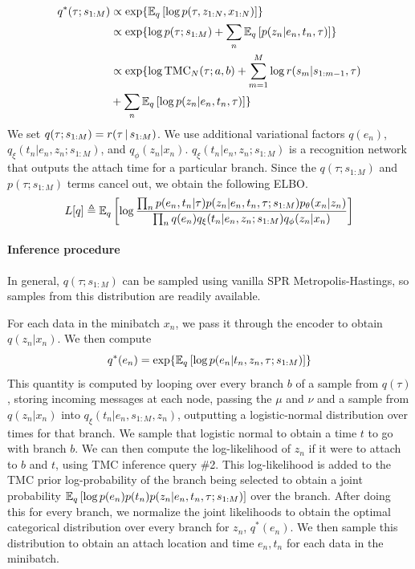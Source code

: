 \begin{equation}
\begin{split}
    q^*(\tau; s_{1:M}) 
    &\propto \exp{\E_q\left[\log p(\tau, z_{1:N}, x_{1:N})\right]} \\
    &\propto \exp{\log p(\tau ; s_{1:M}) + \sum_n \E_q\left[p(z_n | e_n, t_n, \tau)\right]} \\
    &\propto \exp{\log \mathrm{TMC}_N(\tau; a, b) + \sum_{m = 1}^M \log r(s_m | s_{1:m - 1}, \tau) \\&+ \sum_n \E_q\left[\log p(z_n | e_n, t_n, \tau)\right]} \\
\end{split}
\end{equation}
We  set $q(\tau; s_{1:M}) = r(\tau \,|\, s_{1:M})$.
We use additional variational factors
$q(e_n)$,
$q_{\xi}(t_n | e_n, z_n; s_{1:M})$,
and
$q_\phi(z_n | x_n)$.
$q_{\xi}(t_n | e_n, z_n; s_{1:M})$ is a
recognition network that outputs
the attach time for a particular branch.
Since the $q(\tau; s_{1:M})$ and $p(\tau; s_{1:M})$ terms
cancel out, we obtain the following ELBO.
\begin{equation}
    \begin{split}
    L[q] &\triangleq \mathbb{E}_q \left[\log \frac{\prod_n p(e_n, t_n | \tau) p(z_n | e_n, t_n, \tau; s_{1:M})p_\theta(x_n | z_n)}{\prod_n q(e_n)q_{\xi}(t_n | e_n, z_n; s_{1:M})q_\phi(z_n | x_n)}\right] \\
    \end{split}
\end{equation}

\paragraph{Inference procedure}
In general, $q(\tau; s_{1:M})$ can
be sampled using vanilla SPR Metropolis-Hastings,
so samples from this distribution are readily available. 

For each data in the minibatch $x_n$, we pass it
through the encoder to obtain $q(z_n | x_n)$.
We then compute
\begin{equation}
    q^*(e_n) = \exp{\E_q\left[\log p(e_n | t_n, z_n, \tau; s_{1:M})\right]}
\end{equation}
This quantity is computed by looping
over every branch $b$ of 
a sample from $q(\tau)$,
storing incoming messages at each node,
passing the $\mu$ and $\nu$
and a sample from $q(z_n | x_n)$
into $q_\xi(t_n | e_n, s_{1:M}, z_n)$,
outputting a logistic-normal distribution
over times for that branch. We sample that
logistic normal to obtain a time $t$
to go with branch $b$. We can then compute
the log-likelihood of $z_n$ if it were
to attach to $b$ and $t$, using TMC
inference query \#2.
This log-likelihood is added to the TMC prior log-probability
of the branch being selected to obtain
a joint probability $\mathbb{E}_q\left[\log p(e_n)p(t_n)p(z_n | e_n, t_n, \tau; s_{1:M})\right]$ over the branch.
After doing this for every branch, we normalize
the joint likelihoods to obtain
the optimal categorical distribution over every branch
for $z_n$, $q^*(e_n)$. We then sample this
distribution to obtain an attach location and time
$e_n, t_n$ for each data in the minibatch.

